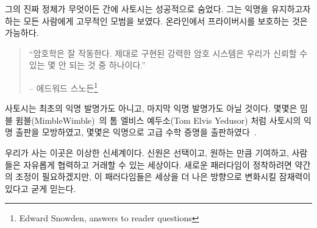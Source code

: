 \begin{comment}
	Whatever his real identity might be, Satoshi was successful in hiding
	it. He set an encouraging example for everyone who wishes to remain
	anonymous: it is possible to have privacy online.
\end{comment}
그의 진짜 정체가 무엇이든 간에 사토시는 성공적으로 숨었다.
그는 익명을 유지하고자 하는 모든 사람에게 고무적인 모범을 보였다.
온라인에서 프라이버시를 보호하는 것은 가능하다.

\begin{quotation}\begin{samepage}
		\enquote{암호학은 잘 작동한다. 제대로 구현된 강력한 암호 시스템은 우리가 신뢰할 수 있는 몇 안 되는 것 중 하나이다.}
		\begin{flushright} -- 에드워드 스노든\footnote{Edward Snowden, answers to reader questions\cite{snowden}}
\end{flushright}\end{samepage}\end{quotation}

\begin{comment}
	Satoshi wasn't the first pseudonymous or anonymous inventor, and he won't be the
	last. Some have directly imitated this pseudonymous publication style, like Tom
	Elvis Yedusor of MimbleWimble~\cite{mimblewimble-origin} fame, while others have
	published advanced mathematical proofs while remaining completely
	anonymous~\cite{4chan-math}.
\end{comment}
사토시는 최초의 익명 발명가도 아니고, 마지막 익명 발명가도 아닐 것이다.
몇몇은 밈블 윔블(MimbleWimble)~\cite{mimblewimble-origin}의 톰 엘비스 예두소(Tom Elvis Yedusor) 처럼 사토시의 익명 출판을 모방하였고, 
몇몇은 익명으로 고급 수학 증명을 출판하였다~\cite{4chan-math}.


\begin{comment}
	It is a strange new world we are living in. A world where identity is
	optional, contributions are accepted based on merit, and people can
	collaborate and transact freely. It will take some adjustment to get
	comfortable with these new paradigms, but I strongly believe that all of
	this has the potential to change the world for the better.
\end{comment}
우리가 사는 이곳은 이상한 신세계이다. 
신원은 선택이고, 원하는 만큼 기여하고, 사람들은 자유롭게 협력하고 거래할 수 있는 세상이다.
새로운 패러다임이 정착하려면 약간의 조정이 필요하겠지만, 
이 패러다임들은 세상을 더 나은 방향으로 변화시킬 잠재력이 있다고 굳게 믿는다.

